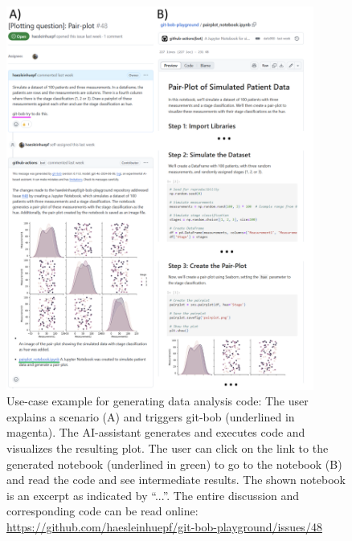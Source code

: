 \documentclass[times, twoside]{zHenriquesLab-StyleBioRxiv}
\begin{document}
\begin{figure}[h]
\centering
\includegraphics[width=0.9\textwidth]{example_pair_plot.png}
\caption{Use-case example for generating data analysis code: The user explains a scenario (A) and triggers git-bob (underlined in magenta). The AI-assistant generates and executes code and visualizes the resulting plot. The user can click on the link to the generated notebook (underlined in green) to go to the notebook (B) and read the code and see intermediate results. The shown notebook is an excerpt as indicated by ``...''. The entire discussion and corresponding code can be read online: \url{https://github.com/haesleinhuepf/git-bob-playground/issues/48}
\newline
\newline
}
\label{fig:examplepairplot}
\end{figure}
\end{document}
